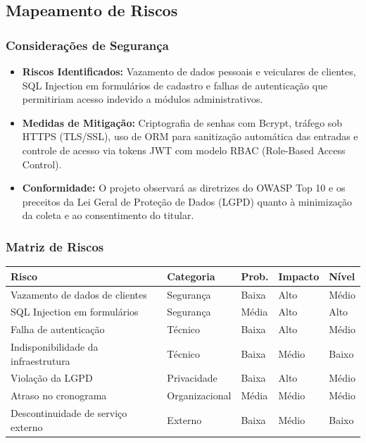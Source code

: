 \documentclass[12pt, a4paper]{article}
\begin{document}
\subsection{Mapeamento de Riscos}

\subsubsection{Considerações de Segurança}

\begin{itemize}
    \item \textbf{Riscos Identificados:} Vazamento de dados pessoais e veiculares de clientes, SQL Injection em formulários de cadastro e falhas de autenticação que permitiriam acesso indevido a módulos administrativos.
    \item \textbf{Medidas de Mitigação:} Criptografia de senhas com Bcrypt, tráfego sob HTTPS (TLS/SSL), uso de ORM para sanitização automática das entradas e controle de acesso via tokens JWT com modelo RBAC (Role-Based Access Control).
    \item \textbf{Conformidade:} O projeto observará as diretrizes do OWASP Top 10 e os preceitos da Lei Geral de Proteção de Dados (LGPD) quanto à minimização da coleta e ao consentimento do titular.
\end{itemize}

\subsubsection{Matriz de Riscos}

\vspace{6pt}
\noindent
\renewcommand{\arraystretch}{1.4}
\begin{tabular}{|L{4.1cm}|L{2.8cm}|L{1.5cm}|L{1.8cm}|L{1.8cm}|}
\hline
\textbf{Risco} & \textbf{Categoria} & \textbf{Prob.} & \textbf{Impacto} & \textbf{Nível} \\
\hline
Vazamento de dados de clientes & Segurança & Baixa & Alto & Médio \\
\hline
SQL Injection em formulários & Segurança & Média & Alto & Alto \\
\hline
Falha de autenticação & Técnico & Baixa & Alto & Médio \\
\hline
Indisponibilidade da infraestrutura & Técnico & Baixa & Médio & Baixo \\
\hline
Violação da LGPD & Privacidade & Baixa & Alto & Médio \\
\hline
Atraso no cronograma & Organizacional & Média & Médio & Médio \\
\hline
Descontinuidade de serviço externo & Externo & Baixa & Médio & Baixo \\
\hline
\end{tabular}
\vspace{6pt}
\end{document}

